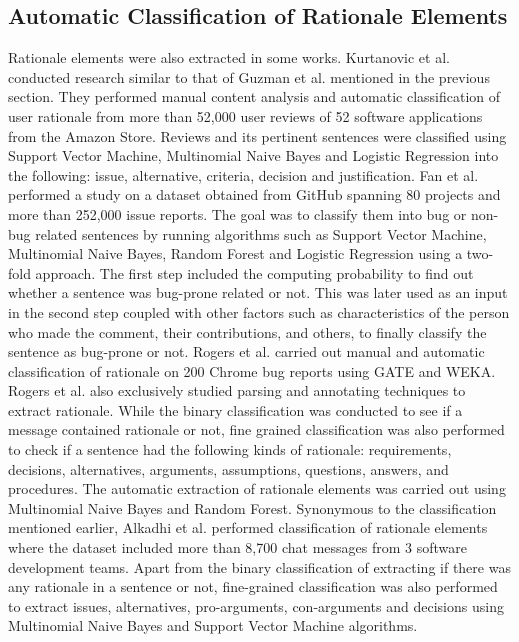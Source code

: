 \documentclass[a4paper,12pt,twoside]{report}
\begin{document}
\subsection{Automatic Classification of Rationale Elements}
Rationale elements were also extracted in some works. Kurtanovic et al.\cite{Kurtanovic2017} conducted research similar to that of Guzman et al.\cite{Guzman2017} mentioned in the previous section. They performed manual content analysis and automatic classification of user rationale from more than 52,000 user reviews of 52 software applications from the Amazon Store. Reviews and its pertinent sentences were classified using Support Vector Machine, Multinomial Naive Bayes and Logistic Regression into the following: issue, alternative, criteria, decision and justification.  
\newline \newline
Fan et al.\cite{Fan2017} performed a study on a dataset obtained from GitHub spanning 80 projects and more than 252,000 issue reports. The goal was to classify them into bug or non-bug related sentences by running algorithms such as Support Vector Machine, Multinomial Naive Bayes, Random Forest and Logistic Regression using a two-fold approach. The first step included the computing probability to find out whether a sentence was bug-prone related or not. This was later used as an input in the second step coupled with other factors such as characteristics of the person who made the comment, their contributions, and others, to finally classify the sentence as bug-prone or not. 
\newline \newline
Rogers et al.\cite{Rogers2014} carried out manual and automatic classification of rationale on 200 Chrome bug reports using GATE and WEKA. Rogers et al.\cite{Rogers2012} also exclusively studied parsing and annotating techniques to extract rationale. While the binary classification was conducted to see if a message contained rationale or not, fine grained classification was also performed to check if a sentence had the following kinds of rationale: requirements, decisions, alternatives, arguments, assumptions, questions, answers, and procedures. The automatic extraction of rationale elements was carried out using Multinomial Naive Bayes and Random Forest. 
\newline \newline
Synonymous to the classification mentioned earlier, Alkadhi et al.\cite{Alkadhi2017} performed classification of rationale elements where the dataset included more than 8,700 chat messages from 3 software development teams. Apart from the binary classification of extracting if there was any rationale in a sentence or not, fine-grained classification was also performed to extract issues, alternatives, pro-arguments, con-arguments and decisions using Multinomial Naive Bayes and Support Vector Machine algorithms. 
\end{document}
